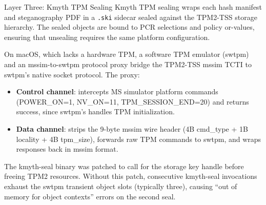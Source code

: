 \documentclass[
  ignorenonframetext,
]{beamer}
\providecommand{\tightlist}{%
  \setlength{\itemsep}{0pt}\setlength{\parskip}{0pt}}
\begin{document}
\begin{frame}{Layer Three: Kmyth TPM Sealing}
\protect{}\label{layer-three-kmyth-tpm-sealing}
Kmyth TPM sealing wraps each hash manifest and steganography PDF in a
\texttt{.ski} sidecar sealed against the TPM2-TSS storage hierarchy. The
sealed objects are bound to PCR selections and policy or-values,
ensuring that unsealing requires the same platform configuration.

On macOS, which lacks a hardware TPM, a software TPM emulator (swtpm)
and an mssim-to-swtpm protocol proxy bridge the TPM2-TSS mssim TCTI to
swtpm's native socket protocol. The proxy:

\begin{itemize}
\tightlist
\item
  \textbf{Control channel}: intercepts MS simulator platform commands
  (POWER\_ON=1, NV\_ON=11, TPM\_SESSION\_END=20) and returns success,
  since swtpm's  handles TPM
  initialization.
\item
  \textbf{Data channel}: strips the 9-byte mssim wire header (4B
  cmd\_type + 1B locality + 4B tpm\_size), forwards raw TPM commands to
  swtpm, and wraps responses back in mssim format.
\end{itemize}

The kmyth-seal binary was patched to call
 for the storage key handle before
freeing TPM2 resources. Without this patch, consecutive kmyth-seal
invocations exhaust the swtpm transient object slots (typically three),
causing ``out of memory for object contexts'' errors on the second seal.
\end{frame}
\end{document}

